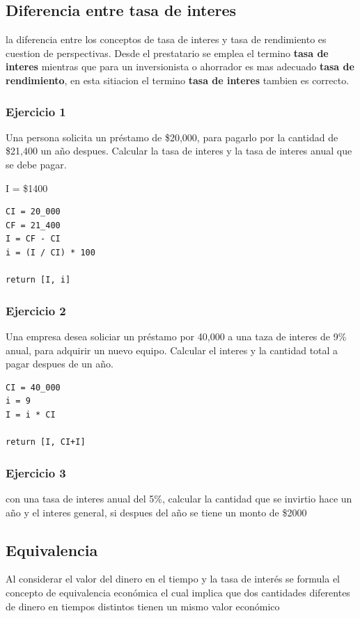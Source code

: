 \documentclass[11pt]{article}
\begin{document}
\subsection*{Diferencia entre tasa de interes}
\label{sec:org5e7964b}
la diferencia entre los conceptos de tasa de interes y tasa de rendimiento es cuestion de perspectivas. Desde el prestatario se emplea el termino \textbf{tasa de interes} mientras que para un inversionista o ahorrador es mas adecuado \textbf{tasa de rendimiento}, en esta sitiacion el termino \textbf{tasa de interes} tambien es correcto.


\subsubsection*{Ejercicio 1}
\label{sec:org643b35d}
Una persona solicita un préstamo de \$20,000, para pagarlo por la cantidad de \$21,400 un año despues. Calcular la tasa de interes y la tasa de interes anual que se debe pagar. 

I = \$1400

\begin{verbatim}
CI = 20_000
CF = 21_400
I = CF - CI
i = (I / CI) * 100

return [I, i]
\end{verbatim}


\subsubsection*{Ejercicio 2}
\label{sec:org62bc853}
Una empresa desea soliciar un préstamo por 40,000 a una taza de interes de 9\% anual, para adquirir un nuevo equipo. Calcular el interes y la cantidad total a pagar despues de un año.

\begin{verbatim}
CI = 40_000
i = 9
I = i * CI 

return [I, CI+I]
\end{verbatim}

\subsubsection*{Ejercicio 3}
\label{sec:orgef33de9}
con una tasa de interes anual del 5\%, calcular la cantidad que se invirtio hace un año y el interes general, si despues del año se tiene un monto de \$2000

\subsection*{Equivalencia}
\label{sec:orge4b46bc}
Al considerar el valor del dinero en el tiempo y la tasa de interés se formula el concepto de equivalencia económica el cual implica que dos cantidades diferentes de dinero en tiempos distintos tienen un mismo valor económico
\end{document}
